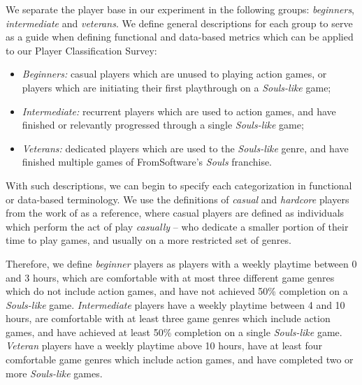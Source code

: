 We separate the player base in our experiment in the following groups: \emph{beginners}, \emph{intermediate} and \emph{veterans}. We define general descriptions for each group to serve as a guide when defining functional and data-based metrics which can be applied to our Player Classification Survey:

\begin{itemize}
    \item{\emph{Beginners:} casual players which are unused to playing action games, or players which are initiating their first playthrough on a \emph{Souls-like} game;}
    \item{\emph{Intermediate:} recurrent players which are used to action games, and have finished or relevantly progressed through a single \emph{Souls-like} game;}
    \item{\emph{Veterans:} dedicated players which are used to the \emph{Souls-like} genre, and have finished multiple games of FromSoftware's \emph{Souls} franchise.}
\end{itemize}


With such descriptions, we can begin to specify each categorization in functional or data-based terminology. We use the definitions of \emph{casual} and \emph{hardcore} players from the work of  \citet{ARTICLE_CasualsHardcoreDefinition} as a reference, where casual players are defined as individuals which perform the act of play \emph{casually} -- who dedicate a smaller portion of their time to play games, and usually on a more restricted set of genres.

Therefore, we define \emph{beginner} players as players with a weekly playtime between 0 and 3 hours, which are comfortable with at most three different game genres which do not include action games, and have not achieved 50\% completion on a \emph{Souls-like} game. \emph{Intermediate} players have a weekly playtime between 4 and 10 hours, are comfortable with at least three game genres which include action games, and have achieved at least 50\% completion on a single \emph{Souls-like} game. \emph{Veteran} players have a weekly playtime above 10 hours, have at least four comfortable game genres which include action games, and have completed two or more \emph{Souls-like} games.



